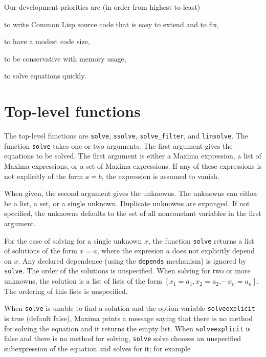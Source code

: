 \documentclass[]{scrartcl}
\begin{document}
\noindent Our development priorities are (in order from highest to least)

\begin{alphalist}[]

\item to write  Common Lisp source code that is easy to extend and to fix,

\item to have a modest code size,

\item to be conservative with memory usage,

\item to solve equations quickly.

\end{alphalist}

\section{Top-level functions}

The top-level functions are \texttt{solve}, \texttt{ssolve}, \texttt{solve\_filter},
and \texttt{linsolve}. The function \texttt{solve} takes  one or two arguments. The first
argument gives the equations to be solved. The first argument is either a Maxima expression,
a list of Maxima expressions, or a set of Maxima expressions. If any of these expressions is
not explicitly of the form \(a = b\), the expression is assumed to vanish.

When given, the second argument gives the unknowns. The unknowns can either be a list, a set, or
a single unknown. Duplicate unknowns are expunged. If not specified, the unknowns defaults to
the set of all nonconstant variables in the first argument.

For the case of solving for a single unknown \(x\), the function \texttt{solve} returns a list
of solutions of the form \(x = a\), where the expresion \(a\) does not explicitly depend on \(x\).
Any declared dependence (using the \texttt{depends} mechanism) is ignored by \texttt{solve}.
The order of the solutions is unspecified. When solving for two or more unknowns, the solution
is a list of lists of the form \([x_1 = a_1, x_2 = a_2, \cdots x_n = a_n] \). The ordering of
this lists is unspecified.

When \texttt{solve} is unable to find a solution and the option variable \texttt{solveexplicit}
is true (default false), Maxima prints a message saying that there is no method for solving the
equation and it returns the empty list. When \texttt{solveexplicit} is false and there is no
method for solving, \texttt{solve} solve chooses an unspecified subexpression of the equation
and solves for it; for example
\end{document}
